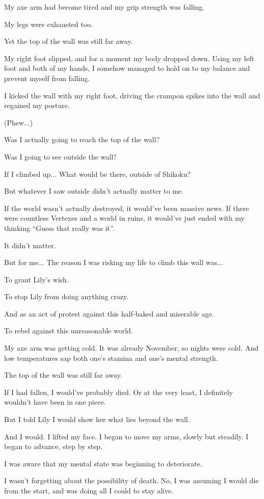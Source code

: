 My axe arm had become tired and my grip strength was falling.

My legs were exhausted too.

Yet the top of the wall was still far away.

My right foot slipped, and for a moment my body dropped down. Using my left foot and both of my hands, I somehow managed to hold on to my balance and prevent myself from falling.

I kicked the wall with my right foot, driving the crampon spikes into the wall and regained my posture.

(Phew...)

Was I actually going to reach the top of the wall?

Was I going to see outside the wall?

If I climbed up... What would be there, outside of Shikoku?

But whatever I saw outside didn't actually matter to me.

If the world wasn't actually destroyed, it would've been massive news. If there were countless Vertexes and a world in ruins, it would've just ended with my thinking ``Guess that really was it''.

It didn't matter.

But for me... The reason I was risking my life to climb this wall was...

To grant Lily's wish.

To stop Lily from doing anything crazy.

And as an act of protest against this half-baked and miserable age.

To rebel against this unreasonable world.

My axe arm was getting cold. It was already November, so nights were cold. And low temperatures sap both one's stamina and one's mental strength.

The top of the wall was still far away.

If I had fallen, I would've probably died. Or at the very least, I definitely wouldn't have been in one piece.

But I told Lily I would show her what lies beyond the wall.

And I would. I lifted my face. I began to move my arms, slowly but steadily. I began to advance, step by step.

I was aware that my mental state was beginning to deteriorate.

I wasn't forgetting about the possibility of death. No, I was assuming I would die from the start, and was doing all I could to stay alive.

